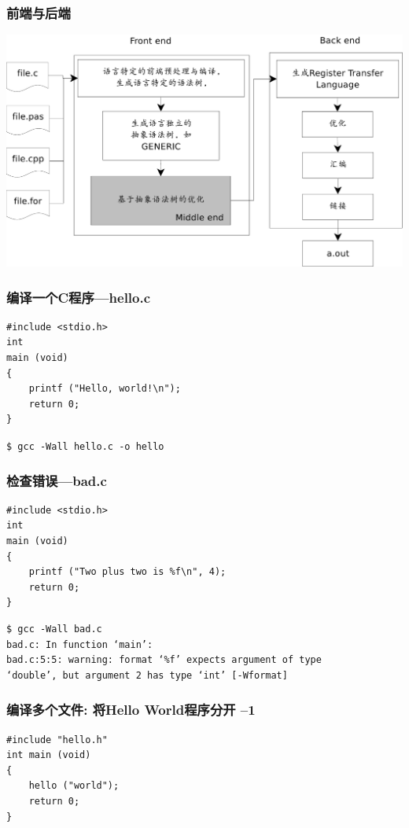 \documentclass[compress]{beamer}
\begin{document}
\begin{frame}
\frametitle{前端与后端}

\includegraphics[width=1.0\hsize]{gcc_twophase.pdf}\\

\end{frame}

\begin{frame}[fragile]
\frametitle{编译一个C程序---hello.c}

\begin{lstlisting}
#include <stdio.h>
int
main (void)
{
    printf ("Hello, world!\n");
    return 0;
}
\end{lstlisting}

\verb~$ gcc -Wall hello.c -o hello~

\end{frame}

\begin{frame}[fragile]
\frametitle{检查错误---bad.c}

\begin{lstlisting}
#include <stdio.h>
int
main (void)
{
    printf ("Two plus two is %f\n", 4);
    return 0;
}
\end{lstlisting}

\footnotesize
\begin{verbatim}
$ gcc -Wall bad.c
bad.c: In function ‘main’:
bad.c:5:5: warning: format ‘%f’ expects argument of type 
‘double’, but argument 2 has type ‘int’ [-Wformat]
\end{verbatim}
\end{frame}


\begin{frame}[fragile]
\frametitle{编译多个文件: 将Hello World程序分开 --1}\label{multifile}
\begin{lstlisting}
#include "hello.h"
int main (void)
{
    hello ("world");
    return 0;
}
\end{lstlisting}

\end{frame}
\end{document}
